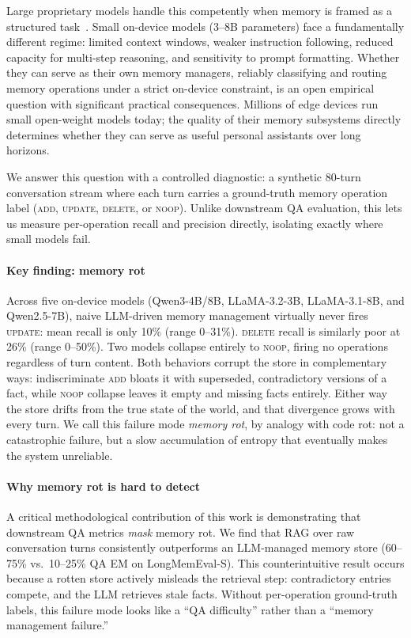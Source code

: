\documentclass[10pt, twocolumn]{article}
\begin{document}
Large proprietary models handle this competently when memory is framed as a
structured task~\cite{packer2023memgpt}.
Small on-device models (3--8B parameters) face a fundamentally different
regime: limited context windows, weaker instruction following, reduced
capacity for multi-step reasoning, and sensitivity to prompt formatting.
Whether they can serve as their own memory managers, reliably classifying and
routing memory operations under a strict on-device constraint, is an open
empirical question with significant practical consequences.
Millions of edge devices run small open-weight models today; the quality of
their memory subsystems directly determines whether they can serve as useful
personal assistants over long horizons.

We answer this question with a controlled diagnostic: a synthetic 80-turn
conversation stream where each turn carries a ground-truth memory operation
label (\textsc{add}, \textsc{update}, \textsc{delete}, or \textsc{noop}).
Unlike downstream QA evaluation, this lets us measure per-operation recall
and precision directly, isolating exactly where small models fail.

\paragraph{Key finding: memory rot}
Across five on-device models (Qwen3-4B/8B, LLaMA-3.2-3B, LLaMA-3.1-8B,
and Qwen2.5-7B), naive LLM-driven memory management virtually never fires
\textsc{update}: mean recall is only 10\% (range 0--31\%).
\textsc{delete} recall is similarly poor at 26\% (range 0--50\%).
Two models collapse entirely to \textsc{noop}, firing no operations regardless
of turn content.
Both behaviors corrupt the store in complementary ways: indiscriminate
\textsc{add} bloats it with superseded, contradictory versions of a fact,
while \textsc{noop} collapse leaves it empty and missing facts entirely.
Either way the store drifts from the true state of the world, and that
divergence grows with every turn.
We call this failure mode \emph{memory rot}, by analogy with code rot:
not a catastrophic failure, but a slow accumulation of entropy that eventually
makes the system unreliable.

\paragraph{Why memory rot is hard to detect}
A critical methodological contribution of this work is demonstrating that
downstream QA metrics \emph{mask} memory rot.
We find that RAG over raw conversation turns consistently outperforms an
LLM-managed memory store (60--75\% vs.\ 10--25\% QA EM on LongMemEval-S).
This counterintuitive result occurs because a rotten store actively
misleads the retrieval step: contradictory entries compete, and the LLM
retrieves stale facts.
Without per-operation ground-truth labels, this failure mode looks like a
``QA difficulty'' rather than a ``memory management failure.''
\end{document}
